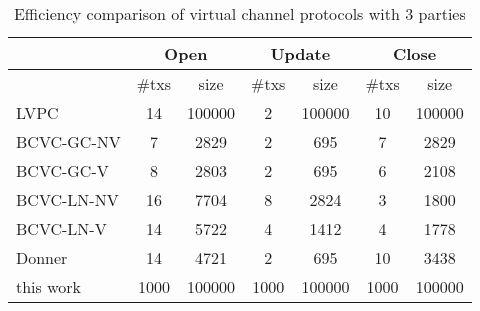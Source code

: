   \begin{table*}
    \caption{Efficiency comparison of virtual channel protocols with $3$
    parties}
    \label{table:comparison:overhead:3-parties}
    \begin{minipage}{\textwidth}
    \begin{center}
    \begin{tabular}{|l|c|c|c|c|c|c|}
    \hline
              & \multicolumn{2}{|c|}{Open} & \multicolumn{2}{|c|}{Update} &
              \multicolumn{2}{|c|}{Close} \\
    \hline
              & \#txs & size & \#txs & size & \#txs & size \\
    \hline
    LVPC       & 14 & 100000 & 2 & 100000 & 10 & 100000 \\
    \hline
    BCVC-GC-NV
              & 7 & 2829 & 2 & 695 & 7 & 2829 \\
    \hline
    BCVC-GC-V & 8 & 2803 & 2 & 695 & 6 & 2108 \\
    \hline
    BCVC-LN-NV
              & 16 & 7704 & 8 & 2824 & 3 & 1800 \\
    \hline
    BCVC-LN-V & 14 & 5722 & 4 & 1412 & 4 & 1778 \\
    \hline
    Donner    & 14 & 4721 & 2 & 695 & 10 & 3438 \\
    \hline
    this work & 1000 & 100000 & 1000 & 100000 & 1000 & 100000 \\
    \hline
    \end{tabular}
    \end{center}
    \end{minipage}
  \end{table*}

